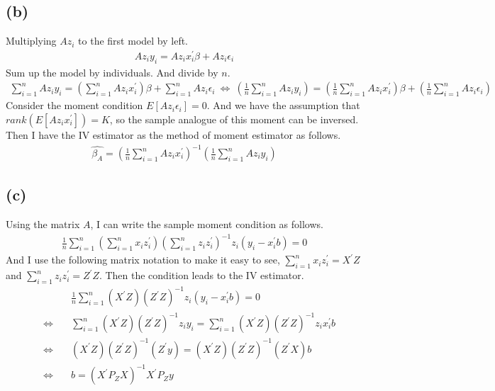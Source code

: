 \documentclass{article}
\begin{document}
\subsection{(b)}
Multiplying $Az_i$ to the first model by left.
\begin{align*}
	Az_iy_i = Az_ix_i^{'}\beta + Az_i\epsilon_i
\end{align*}
Sum up the model by individuals. And divide by $n$.
\begin{align*}
	\sum_{i = 1}^n Az_iy_i = (\sum_{i = 1}^n Az_ix_i^{'})\beta + \sum_{i=1}^nAz_i\epsilon_i \ \Leftrightarrow\ \left(\frac{1}{n}\sum_{i = 1}^n Az_iy_i\right) = \left(\frac{1}{n}\sum_{i = 1}^n Az_ix_i^{'}\right)\beta + \left( \frac{1}{n}\sum_{i=1}^nAz_i\epsilon_i \right)
\end{align*}
Consider the moment condition $E[Az_i\epsilon_i] = 0$. And we have the assumption that $rank(E[Az_i x_i^{'}]) = K$, so the sample analogue of this moment can be inversed. Then I have the IV estimator as the method of moment estimator as follows.
\begin{align*}
	\hat{\beta_A} = \left(\frac{1}{n}\sum_{i = 1}^n Az_ix_i^{'}\right)^{-1} \left(\frac{1}{n}\sum_{i = 1}^n Az_iy_i\right)
\end{align*}

\subsection{(c)}
Using the matrix $A$, I can write the sample moment condition as follows.
\begin{align*}
	\frac{1}{n}\sum_{i = 1}^n \left(\sum_{i = 1}^n x_i z_i^{'}\right)\left(\sum_{i = 1}^n z_i z_i^{'}\right)^{-1} z_i (y_i - x_i^{'}b) = 0
\end{align*}
And I use the following matrix notation to make it easy to see, $\sum_{i = 1}^n x_i z_i^{'} = X^{'}Z$ and $\sum_{i = 1}^n z_i z_i^{'} = Z^{'}Z$. Then the condition leads to the IV estimator.
\begin{align*}
	&\frac{1}{n}\sum_{i = 1}^n \left(X^{'}Z\right)\left(Z^{'}Z\right)^{-1} z_i (y_i - x_i^{'}b) = 0\\[8pt]
	\quad \Leftrightarrow \quad&\sum_{i=1}^n \left(X^{'}Z\right)\left(Z^{'}Z\right)^{-1} z_i y_i = \sum_{i=1}^n \left(X^{'}Z\right)\left(Z^{'}Z\right)^{-1}z_i x_i^{'}b\\[8pt]
	\quad \Leftrightarrow \quad& \left(X^{'}Z\right)\left(Z^{'}Z\right)^{-1}\left(Z^{'}y\right) = \left(X^{'}Z\right)\left(Z^{'}Z\right)^{-1}\left(Z^{'}X\right)b\\[8pt]
	\quad \Leftrightarrow \quad&b = (X^{'}P_ZX)^{-1}X^{'}P_Z y
\end{align*}
\end{document}
